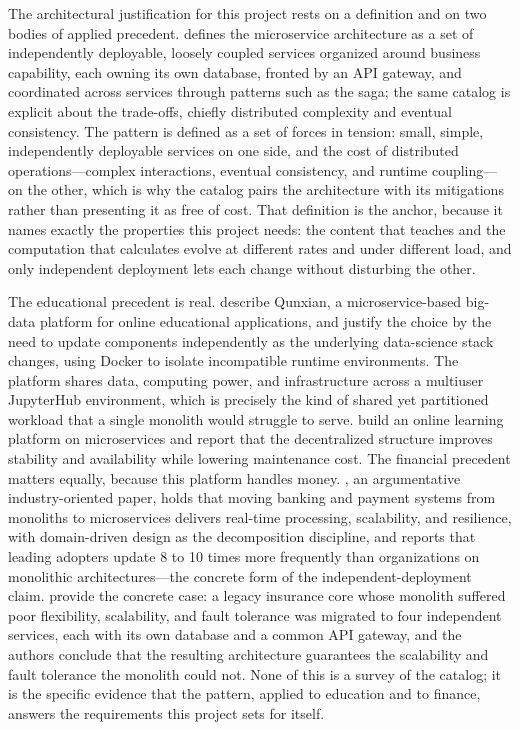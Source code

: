 The architectural justification for this project rests on a definition and on
two bodies of applied precedent. \textcite{richardsonndpattern} defines the
microservice architecture as a set of independently deployable, loosely
coupled services organized around business capability, each owning its own
database, fronted by an API gateway, and coordinated across services through
patterns such as the saga; the same catalog is explicit about the trade-offs,
chiefly distributed complexity and eventual consistency. The pattern is
defined as a set of forces in tension: small, simple, independently deployable
services on one side, and the cost of distributed operations---complex
interactions, eventual consistency, and runtime coupling---on the other, which
is why the catalog pairs the architecture with its mitigations rather than
presenting it as free of cost. That definition is the anchor, because it names exactly the properties this project needs: the
content that teaches and the computation that calculates evolve at different
rates and under different load, and only independent deployment lets each
change without disturbing the other.

The educational precedent is real. \textcite{miao2020microservice} describe
Qunxian, a microservice-based big-data platform for online educational
applications, and justify the choice by the need to update components
independently as the underlying data-science stack changes, using Docker to
isolate incompatible runtime environments. The platform shares data,
computing power, and infrastructure across a multiuser JupyterHub
environment, which is precisely the kind of shared yet partitioned workload
that a single monolith would struggle to serve. \textcite{ren2023design} build an
online learning platform on microservices and report that the decentralized
structure improves stability and availability while lowering maintenance
cost. The financial precedent matters equally, because this platform handles
money. \textcite{dhandapani2025microservices}, an argumentative
industry-oriented paper, holds that moving banking and payment systems from
monoliths to microservices delivers real-time processing, scalability, and
resilience, with domain-driven design as the decomposition discipline, and reports that leading adopters update 8 to
10 times more frequently than organizations on monolithic architectures---the
concrete form of the independent-deployment claim.
\textcite{lange2019microservices} provide the concrete case: a legacy
insurance core whose monolith suffered poor flexibility, scalability, and
fault tolerance was migrated to four independent services, each with its own
database and a common API gateway, and the authors conclude that the
resulting architecture guarantees the scalability and fault tolerance the
monolith could not. None of this is a survey of the catalog; it is the
specific evidence that the pattern, applied to education and to finance,
answers the requirements this project sets for itself.

